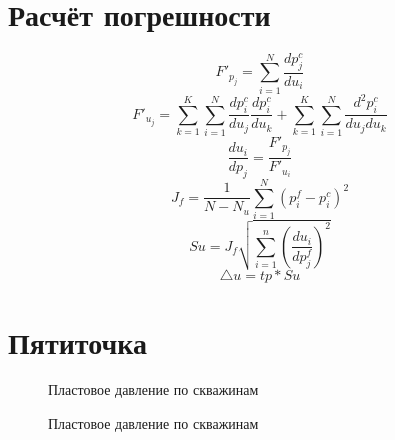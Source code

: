 \documentclass[14pt]{article}
\begin{document}
	\section{Расчёт погрешности}
	\begin{equation} \label{F_p}
		F'_{p_j} = \sum_{i=1}^N{\frac{dp^c_j}{du_i}}
	\end{equation}
	\begin{equation} \label{F_u}
		F'_{u_j} = \sum_{k=1}^K\sum_{i=1}^N{\frac{dp^c_i}{du_j}\frac{dp^c_i}{du_k}} + 
		\sum_{k=1}^K\sum_{i=1}^N{\frac{d^2p^c_i}{du_j du_k}}
	\end{equation}
	\begin{equation} \label{du_dp}
		\frac{du_i}{dp_j} = \frac{F'_{p_j}}{F'_{u_i}}
	\end{equation}
	\begin{equation} \label{Jf}
		J_f = \frac{1}{N-N_u}\sum_{i=1}^N{\left(p_i^f - p_i^c\right)^2}
	\end{equation}
	\begin{equation} \label{Sp}
		Su = J_f\sqrt{\sum_{i=1}^n{\left(\frac{du_i}{dp^f_j}\right)^2}}
	\end{equation}
	\begin{equation} \label{delta_u}
		\triangle{u} = tp*Su
	\end{equation}
	
	\section{Пятиточка}
\begin{figure}
	\caption{Пластовое давление по скважинам}
	\label{fig:map}
\end{figure}
\begin{figure}
	\caption{Пластовое давление по скважинам}
	\label{fig:map}
\end{figure}
\begin{figure}
\end{figure}
\begin{figure}
\end{figure}
\end{document}
